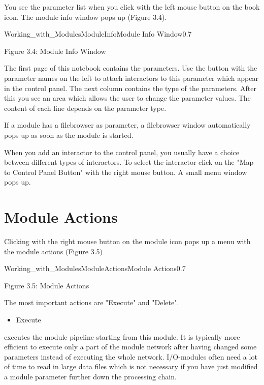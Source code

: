 You see the parameter list when you click with the left mouse button on the book icon. 
The module info window pops up (Figure 3.4).


\begin{covimg}{Working_with_Modules}{ModuleInfo}{Module Info Window}{0.7}\end{covimg}
\begin{htmlonly}
Figure 3.4: Module Info Window
\vspace{0.5cm}
\end{htmlonly}

The first page of this notebook contains the parameters. Use the button with the parameter 
names on the left to attach interactors to this parameter which appear in the control panel. The next column contains the type of the parameters.
After this you see an area which allows the user to change the  parameter values. The 
content of each line depends on the parameter type.

If a module has a filebrowser as parameter, a filebrowser window automatically pops up as 
soon as the module is started.

When you add an interactor to the control panel, you usually have a choice between 
different types of interactors. To select the interactor click on the "Map to Control 
Panel Button" with the right mouse button. A small menu window pops up. 

\section{Module Actions}

Clicking with the right mouse button on the module icon pops up a menu with the module 
actions (Figure 3.5)

\begin{covimg}{Working_with_Modules}{ModuleActions}{Module Actions}{0.7}\end{covimg}
\begin{htmlonly}
Figure 3.5: Module Actions
\vspace{0.5cm}
\end{htmlonly}

The most important actions are "Execute" and "Delete".

\begin{itemize}
\item Execute 
\end{itemize}

executes the module pipeline starting from this module. It is typically more efficient 
to execute only a part of the module network after having changed some parameters instead 
of executing the whole network. I/O-modules often need a lot of time to read in large data 
files which is not necessary if you have just modified a module parameter
further down the processing chain.

